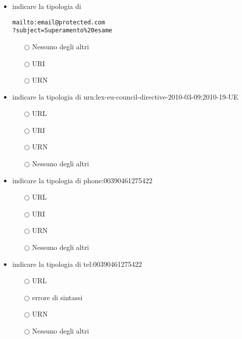 \documentclass[10pt,twocolumn]{article}
\begin{document}
\begin{itemize}
    \item indicare la tipologia di
          \begin{verbatim}
mailto:email@protected.com
?subject=Superamento%20esame 
\end{verbatim}
          \begin{itemize}
              \item[$\bigcirc$] Nessuno degli altri
              \item[$\bigcirc$] URI
              \item[$\bigcirc$] URN
          \end{itemize}
\end{itemize}
\begin{itemize}
    \item indicare la tipologia di urn:lex-eu-council-directive-2010-03-09;2010-19-UE
          \begin{itemize}
              \item[$\bigcirc$] URL
              \item[$\bigcirc$] URI
              \item[$\bigcirc$] URN
              \item[$\bigcirc$] Nessuno degli altri
          \end{itemize}
\end{itemize}
\begin{itemize}
    \item indicare la tipologia di phone:00390461275422
          \begin{itemize}
              \item[$\bigcirc$] URL
              \item[$\bigcirc$] URI
              \item[$\bigcirc$] URN
              \item[$\bigcirc$] Nessuno degli altri
          \end{itemize}
\end{itemize}
\begin{itemize}
    \item indicare la tipologia di tel:00390461275422
          \begin{itemize}
              \item[$\bigcirc$] URL
              \item[$\bigcirc$] errore di sintassi
              \item[$\bigcirc$] URN
              \item[$\bigcirc$] Nessuno degli altri
          \end{itemize}
\end{itemize}
\end{document}
